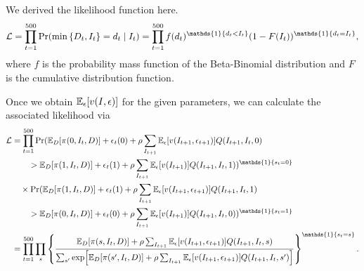 \documentclass[12pt]{article}
\begin{document}
\begin{sol}[1.6]
    We derived the likelihood function here. 
    \begin{equation*}
        \mathcal{L} = \prod_{t=1}^{500}\Pr(\min\brc{D_t, I_t} = d_t\mid I_t) = \prod_{t=1}^{500}f(d_t)^{\mathds{1}\brc{d_t < I_t}}(1-F(I_t))^{\mathds{1}\brc{d_t = I_t}},
    \end{equation*}
    where $f$ is the probability mass function of the Beta-Binomial distribution and $F$ is the cumulative distribution function.
    \solend
\end{sol}
\begin{sol}[1.7]
    Once we obtain $\E_\epsilon\sbrc{v(I,\epsilon)}$ for the given parameters, 
    we can calculate the associated likelihood via 
    \begin{equation*}
        \begin{aligned}
            \mathcal{L} &= \prod_{t=1}^{500}\Pr(\E_D\sbrc{\pi(0,I_t,D)} + \epsilon_t(0) + \rho\sum_{I_{t+1}}\E_\epsilon\sbrc{v(I_{t+1}, \epsilon_{t+1})}Q(I_{t+1}, I_t, 0) \\
            &\qquad > \E_D\sbrc{\pi(1,I_t,D)} + \epsilon_t(1) + \rho\sum_{I_{t+1}}\E_\epsilon\sbrc{v(I_{t+1})}Q(I_{t+1}, I_t, 1))^{\mathds{1}\brc{s_t = 0}} \\
            &\quad \times \Pr(\E_D\sbrc{\pi(1,I_t,D)} + \epsilon_t(1) + \rho\sum_{I_{t+1}}\E_\epsilon\sbrc{v(I_{t+1}, \epsilon_{t+1})}Q(I_{t+1}, I_t, 1) \\
            &\qquad > \E_D\sbrc{\pi(0,I_t,D)} + \epsilon_t(0) + \rho\sum_{I_{t+1}}\E_\epsilon\sbrc{v(I_{t+1})}Q(I_{t+1}, I_t, 0))^{\mathds{1}\brc{s_t = 1}}\\
            &= \prod_{t=1}^{500}\prod_{s} \brc{\frac{\E_D\sbrc{\pi(s,I_t,D)} + \rho\sum_{I_{t+1}}\E_\epsilon\sbrc{v(I_{t+1}, \epsilon_{t+1})}Q(I_{t+1}, I_t, s)}{\sum_{s'} \exp\sbrc{\E_D\sbrc{\pi(s',I_t,D)} + \rho\sum_{I_{t+1}}\E_\epsilon\sbrc{v(I_{t+1}, \epsilon_{t+1})}Q(I_{t+1}, I_t, s')}}}^{\mathds{1}\brc{s_t = s}}.
        \end{aligned}
    \end{equation*}
    \solend
\end{sol}
\end{document}
